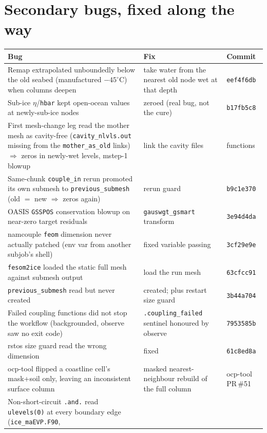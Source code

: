 \documentclass[11pt,a4paper]{article}
\newcommand{\code}[1]{\texttt{\small #1}}
\begin{document}
\section{Secondary bugs, fixed along the way}

\begin{longtable}{@{}p{6.2cm}p{6.6cm}p{2.2cm}@{}}
\toprule
\textbf{Bug} & \textbf{Fix} & \textbf{Commit} \\
\midrule
\endhead
Remap extrapolated unboundedly below the old seabed (manufactured $-45^\circ$C) when columns
  deepen & take water from the nearest old node wet at that depth & \code{eef4f6db} \\
Sub-ice $\eta$/\code{hbar} kept open-ocean values at newly-sub-ice nodes & zeroed (real bug, not
  the cure) & \code{b17fb5c8} \\
First mesh-change leg read the mother mesh as cavity-free (\code{cavity\_nlvls.out} missing from
  the \code{mother\_as\_old} links) $\Rightarrow$ zeros in newly-wet levels, mstep-1 blowup &
  link the cavity files & functions \\
Same-chunk \code{couple\_in} rerun promoted its own submesh to \code{previous\_submesh}
  (old $=$ new $\Rightarrow$ zeros again) & rerun guard & \code{b9c1e370} \\
OASIS \code{GSSPOS} conservation blowup on near-zero target residuals & \code{gauswgt\_gsmart}
  transform & \code{3e94d4da} \\
namcouple \code{feom} dimension never actually patched (env var from another subjob's shell) &
  fixed variable passing & \code{3cf29e9e} \\
\code{fesom2ice} loaded the static full mesh against submesh output & load the run mesh &
  \code{63cfcc91} \\
\code{previous\_submesh} read but never created & created; plus restart size guard &
  \code{3b44a704} \\
Failed coupling functions did not stop the workflow (backgrounded, observe saw no exit code) &
  \code{.coupling\_failed} sentinel honoured by observe & \code{7953585b} \\
rstos size guard read the wrong dimension & fixed & \code{61c8ed8a} \\
ocp-tool flipped a coastline cell's mask+soil only, leaving an inconsistent surface column &
  masked nearest-neighbour rebuild of the full column & ocp-tool PR\,\#51 \\
Non-short-circuit \code{.and.} read \code{ulevels(0)} at every boundary edge (\code{ice\_maEVP.F90},

\end{longtable}
\end{document}

